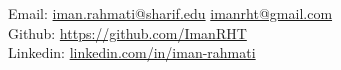 { %
\noindent
\small \faEnvelope  \hspace{0.05cm}   Email: \href{mailto:iman.rahmati@sharif.edu}{iman.rahmati@sharif.edu} \space \href{mailto:imanrht@gmail.com}{imanrht@gmail.com} \\
\faGithub \hspace{0.1cm} Github: \href{https://github.com/ImanRHT}{https://github.com/ImanRHT}  \\
\faLinkedin \hspace{0.1cm} Linkedin: \href{https://linkedin.com/in/iman-rahmati}{linkedin.com/in/iman-rahmati}\\
}
